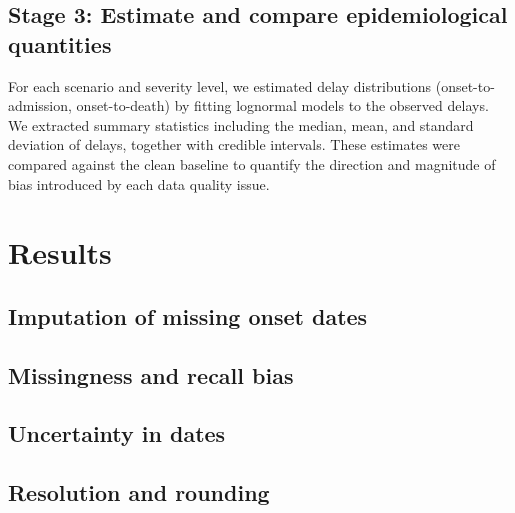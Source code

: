 \documentclass[11pt,a4paper]{article}
\begin{document}
\subsection{Stage 3: Estimate and compare epidemiological quantities}

For each scenario and severity level, we estimated delay distributions (onset-to-admission, onset-to-death) by fitting lognormal models to the observed delays.
We extracted summary statistics including the median, mean, and standard deviation of delays, together with credible intervals.
These estimates were compared against the clean baseline to quantify the direction and magnitude of bias introduced by each data quality issue.


\section{Results}


\subsection{Imputation of missing onset dates}


\subsection{Missingness and recall bias}


\subsection{Uncertainty in dates}


\subsection{Resolution and rounding}
\end{document}
